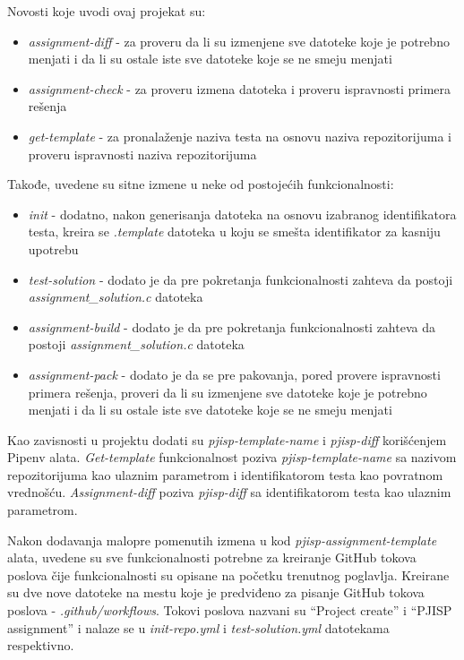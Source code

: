 \documentclass[12pt]{report}
\begin{document}
Novosti koje uvodi ovaj projekat su:

\begin{itemize}
    \item \textit{assignment-diff} - za proveru da li su izmenjene sve datoteke koje je potrebno menjati i da li su ostale iste sve datoteke koje se ne smeju menjati
    \item \textit{assignment-check} - za proveru izmena datoteka i proveru ispravnosti primera rešenja
    \item \textit{get-template} - za pronalaženje naziva testa na osnovu naziva repozitorijuma i proveru ispravnosti naziva repozitorijuma
\end{itemize}

Takođe, uvedene su sitne izmene u neke od postojećih funkcionalnosti:

\begin{itemize}
    \item \textit{init} - dodatno, nakon generisanja datoteka na osnovu izabranog identifikatora testa, kreira se \textit{.template} datoteka u koju se smešta identifikator za kasniju upotrebu
    \item \textit{test-solution} - dodato je da pre pokretanja funkcionalnosti zahteva da postoji \textit{assignment\_solution.c} datoteka
    \item \textit{assignment-build} - dodato je da pre pokretanja funkcionalnosti zahteva da postoji \textit{assignment\_solution.c} datoteka
    \item \textit{assignment-pack} - dodato je da se pre pakovanja, pored provere ispravnosti primera rešenja, proveri da li su izmenjene sve datoteke koje je potrebno menjati i da li su ostale iste sve datoteke koje se ne smeju menjati
\end{itemize}

Kao zavisnosti u projektu dodati su \textit{pjisp-template-name} i \textit{pjisp-diff} korišćenjem Pipenv alata. \textit{Get-template} funkcionalnost poziva \textit{pjisp-template-name} sa nazivom repozitorijuma kao ulaznim parametrom i identifikatorom testa kao povratnom vrednošću. \textit{Assignment-diff} poziva \textit{pjisp-diff} sa identifikatorom testa kao ulaznim parametrom.

Nakon dodavanja malopre pomenutih izmena u kod \textit{pjisp-assignment-template} alata, uvedene su sve funkcionalnosti potrebne za kreiranje GitHub tokova poslova čije funkcionalnosti su opisane na početku trenutnog poglavlja. Kreirane su dve nove datoteke na mestu koje je predviđeno za pisanje GitHub tokova poslova - \textit{.github/workflows}. Tokovi poslova nazvani su ``Project create'' i ``PJISP assignment'' i nalaze se u \textit{init-repo.yml} i \textit{test-solution.yml} datotekama respektivno.
\end{document}
